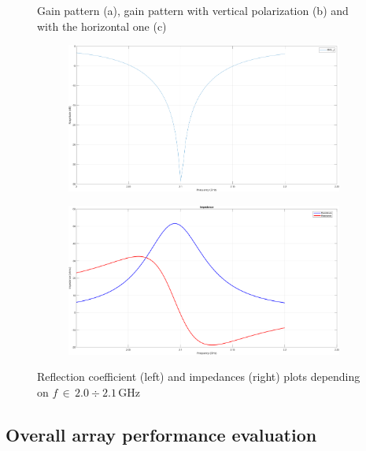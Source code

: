 \documentclass{ieeeojies}
\begin{document}
\begin{center}
\begin{figure}[t]
\begin{subfigure}[t]{0.32\textwidth}
						\subcaption{}
	\end{subfigure}
		\caption{ Gain pattern (a), gain pattern with vertical polarization (b) and with the horizontal one (c)}
	\end{figure}
\end{center}


\begin{center}
	\begin{figure}[t]
			\begin{subfigure}[t]{0.5\textwidth}
		\includegraphics[width = \linewidth]{gamma.png}
								\subcaption{}
	\end{subfigure}
	\begin{subfigure}[t]{0.5\textwidth}
		\includegraphics[width = \linewidth]{impedances.png}
						\subcaption{}		
	\end{subfigure}
		\caption{ Reflection coefficient (left) and impedances (right) plots depending on $f\,\in\,2.0\div 2.1\,\text{GHz}$}
	\end{figure}
\end{center}
\subsection{Overall array performance evaluation}
\end{document}
